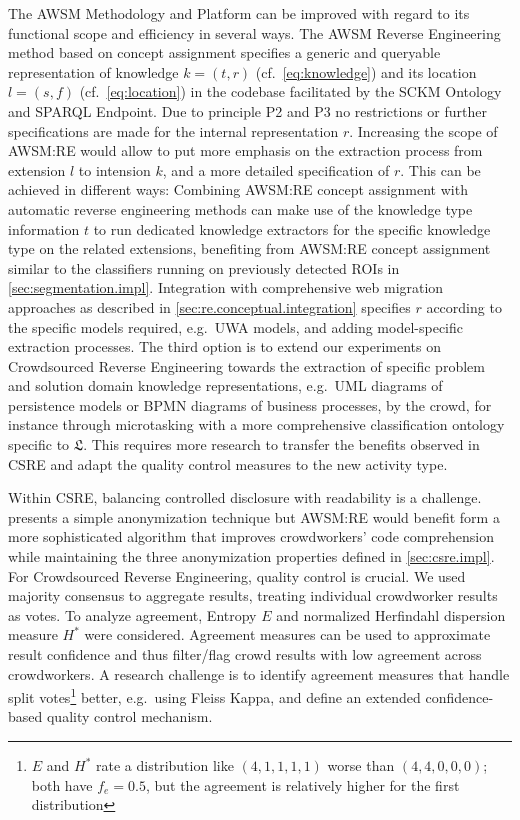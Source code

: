 The AWSM Methodology and Platform can be improved with regard to its functional scope and efficiency in several ways.
The AWSM Reverse Engineering method based on concept assignment specifies a generic and queryable representation of knowledge \(k=(t,r)\) (cf.~\cref{eq:knowledge}) and its location \(l=(s,f)\) (cf.~\cref{eq:location}) in the codebase facilitated by the SCKM Ontology and SPARQL Endpoint.
Due to principle P2 and P3 no restrictions or further specifications are made for the internal representation \(r\).
Increasing the scope of AWSM:RE would allow to put more emphasis on the extraction process from extension \autocite{Chen2010FeatureLocation} \(l\) to intension \autocite{Chen2010FeatureLocation} \(k\), and a more detailed specification of \(r\).
This can be achieved in different ways: Combining AWSM:RE concept assignment with automatic reverse engineering methods can make use of the knowledge type information \(t\) to run dedicated knowledge extractors for the specific knowledge type on the related extensions, benefiting from AWSM:RE concept assignment similar to the classifiers running on previously detected ROIs in \cref{sec:segmentation.impl}.
Integration with comprehensive web migration approaches as described in \cref{sec:re.conceptual.integration} specifies \(r\) according to the specific models required, e.g.~UWA models, and adding model-specific extraction processes.
The third option is to extend our experiments on Crowdsourced Reverse Engineering towards the extraction of specific problem and solution domain knowledge representations, e.g.~UML diagrams of persistence models or BPMN diagrams of business processes, by the crowd, for instance through microtasking with a more comprehensive classification ontology specific to \(\mathfrak{L}\).
This requires more research to transfer the benefits observed in CSRE and adapt the quality control measures to the new activity type.

Within CSRE, balancing controlled disclosure with readability is a challenge.
 presents a simple anonymization technique but AWSM:RE would benefit form a more sophisticated algorithm that improves crowdworkers' code comprehension while maintaining the three anonymization properties defined in \cref{sec:csre.impl}.
For Crowdsourced Reverse Engineering, quality control is crucial.
We used majority consensus to aggregate results, treating individual crowdworker results as votes.
To analyze agreement, Entropy \(E\) and normalized Herfindahl dispersion measure \(H^*\) were considered.
Agreement measures can be used to approximate result confidence and thus filter/flag crowd results with low agreement across crowdworkers.
A research challenge is to identify agreement measures that handle split votes\footnote{\(E\) and \(H^*\) rate a distribution like \((4,1,1,1,1)\) worse than \((4,4,0,0,0)\); both have \(f_e = 0.5\), but the agreement is relatively higher for the first distribution} better, e.g.~using Fleiss Kappa, and define an extended confidence-based quality control mechanism.

